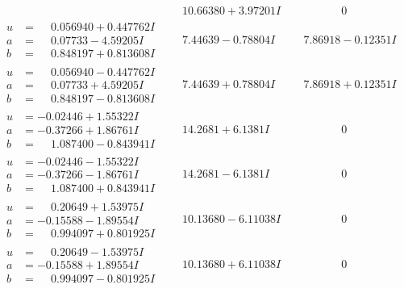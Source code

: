 \documentclass[1p]{elsarticle_modified}
\theoremstyle{definition}
\begin{document}
$$\begin{array}{c|c|c}
 & \phantom{-}10.66380 + 3.97201 I & \phantom{-0.000000 } 0 \\ \hline\begin{aligned}
u &= \phantom{-}0.056940 + 0.447762 I \\
a &= \phantom{-}0.07733 - 4.59205 I \\
b &= \phantom{-}0.848197 + 0.813608 I\end{aligned}
 & \phantom{-}7.44639 - 0.78804 I & \phantom{-}7.86918 - 0.12351 I \\ \hline\begin{aligned}
u &= \phantom{-}0.056940 - 0.447762 I \\
a &= \phantom{-}0.07733 + 4.59205 I \\
b &= \phantom{-}0.848197 - 0.813608 I\end{aligned}
 & \phantom{-}7.44639 + 0.78804 I & \phantom{-}7.86918 + 0.12351 I \\ \hline\begin{aligned}
u &= -0.02446 + 1.55322 I \\
a &= -0.37266 + 1.86761 I \\
b &= \phantom{-}1.087400 - 0.843941 I\end{aligned}
 & \phantom{-}14.2681 + 6.1381 I & \phantom{-0.000000 } 0 \\ \hline\begin{aligned}
u &= -0.02446 - 1.55322 I \\
a &= -0.37266 - 1.86761 I \\
b &= \phantom{-}1.087400 + 0.843941 I\end{aligned}
 & \phantom{-}14.2681 - 6.1381 I & \phantom{-0.000000 } 0 \\ \hline\begin{aligned}
u &= \phantom{-}0.20649 + 1.53975 I \\
a &= -0.15588 - 1.89554 I \\
b &= \phantom{-}0.994097 + 0.801925 I\end{aligned}
 & \phantom{-}10.13680 - 6.11038 I & \phantom{-0.000000 } 0 \\ \hline\begin{aligned}
u &= \phantom{-}0.20649 - 1.53975 I \\
a &= -0.15588 + 1.89554 I \\
b &= \phantom{-}0.994097 - 0.801925 I\end{aligned}
 & \phantom{-}10.13680 + 6.11038 I & \phantom{-0.000000 } 0 \\ \hline\begin{aligned}

\end{aligned}
\end{array}$$
\end{document}
